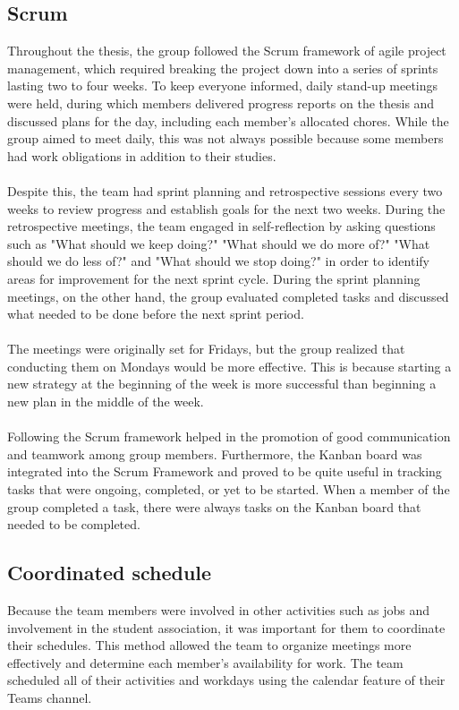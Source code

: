 \subsection{Scrum}
Throughout the thesis, the group followed the Scrum framework of agile project management, which required breaking the project down into a series of sprints lasting two to four weeks. To keep everyone informed, daily stand-up meetings were held, during which members delivered progress reports on the thesis and discussed plans for the day, including each member's allocated chores. While the group aimed to meet daily, this was not always possible because some members had work obligations in addition to their studies.
\\~\\
Despite this, the team had sprint planning and retrospective sessions every two weeks to review progress and establish goals for the next two weeks. During the retrospective meetings, the team engaged in self-reflection by asking questions such as "What should we keep doing?" "What should we do more of?" "What should we do less of?" and "What should we stop doing?" in order to identify areas for improvement for the next sprint cycle. During the sprint planning meetings, on the other hand, the group evaluated completed tasks and discussed what needed to be done before the next sprint period.
\\~\\
The meetings were originally set for Fridays, but the group realized that conducting them on Mondays would be more effective. This is because starting a new strategy at the beginning of the week is more successful than beginning a new plan in the middle of the week.
\\~\\
Following the Scrum framework helped in the promotion of good communication and teamwork among group members. Furthermore, the Kanban board was integrated into the Scrum Framework and proved to be quite useful in tracking tasks that were ongoing, completed, or yet to be started. When a member of the group completed a task, there were always tasks on the Kanban board that needed to be completed. 


\subsection{Coordinated schedule}
Because the team members were involved in other activities such as jobs and involvement in the student association, it was important for them to coordinate their schedules. This method allowed the team to organize meetings more effectively and determine each member's availability for work. The team scheduled all of their activities and workdays using the calendar feature of their Teams channel.

